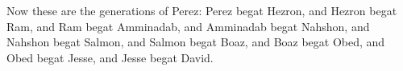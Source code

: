 Now these are the generations of Perez: Perez begat Hezron, and Hezron begat Ram, and Ram begat Amminadab, and Amminadab begat Nahshon, and Nahshon begat Salmon, and Salmon begat Boaz, and Boaz begat Obed, and Obed begat Jesse, and Jesse begat David. 